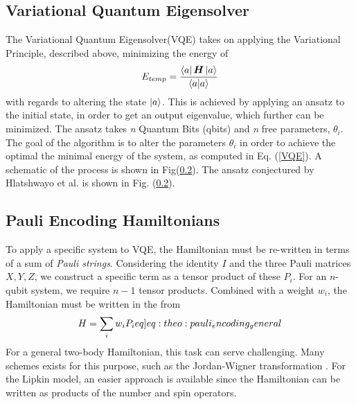 \subsection{Variational Quantum Eigensolver}
The Variational Quantum Eigensolver(VQE) takes on applying the Variational Principle, described above, minimizing the energy of 
\begin{equation}\label{VQE}
    E_{temp} = \frac{\bra{a}\boldsymbol{H}\ket{a}}{\braket{a}}
\end{equation}
with regards to altering the state $\ket{a}$. This is achieved by applying an ansatz to the initial state, in order to get an output eigenvalue, which further can be minimized. The ansatz takes \textit{n} Quantum Bits (qbits) and \textit{n} free parameters, $\theta_i$. The goal of the algorithm is to alter the parameters $\theta_i$ in order to achieve the optimal the minimal energy of the system, as computed in Eq. (\ref{VQE}). A schematic of the process is shown in Fig(\ref{}). The ansatz conjectured by Hlatshwayo et al. \cite{} is shown in Fig. (\ref{}). 

\subsection{Pauli Encoding Hamiltonians}
To apply a specific system to VQE, the Hamiltonian must be re-written in terms of a sum of \textit{Pauli strings}. Considering the identity $I$ and the three Pauli matrices $X, Y, Z$, we construct a specific term as a tensor product of these $P_i$. For an $n$-qubit system, we require $n-1$ tensor products. Combined with a weight $w_i$, the Hamiltonian must be written in the from
\begin{align}
    H = \sum_i w_i P_i \label[eq]{eq:theo:pauli_encoding_general}
\end{align}
For a general two-body Hamiltonian, this task can serve challenging. Many schemes exists for this purpose, such as the Jordan-Wigner transformation \citep{steudtnerMethodsSimulateFermions2019}. For the Lipkin model, an easier approach is available since the Hamiltonian can be written as products of the number and spin operators.